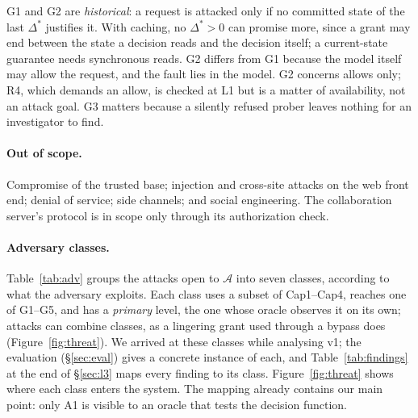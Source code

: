 \documentclass[sigconf,review,anonymous]{acmart}
\begin{document}
G1 and G2 are \emph{historical}: a request is attacked only if no committed state of the last $\Delta^\ast$
justifies it. With caching, no $\Delta^\ast>0$ can promise more, since a grant may end between the state a
decision reads and the decision itself; a current-state guarantee needs synchronous reads. G2 differs from G1
because the model itself may allow the request, and the fault lies in the model. G2 concerns allows only;
R4, which demands an allow, is checked at L1 but is a matter of availability, not an attack goal. G3 matters
because a silently refused prober leaves nothing for an investigator to find.

\paragraph{Out of scope.} Compromise of the trusted base; injection and cross-site attacks on the web
front end; denial of service; side channels; and social engineering. The collaboration server's protocol is in
scope only through its authorization check.

\paragraph{Adversary classes.} Table~\ref{tab:adv} groups the attacks open to $\mathcal{A}$ into seven classes,
according to what the adversary exploits. Each class uses a subset of Cap1--Cap4, reaches one of G1--G5, and has a
\emph{primary} level, the one whose oracle observes it on its own; attacks can combine classes, as a lingering
grant used through a bypass does (Figure~\ref{fig:threat}). We arrived at these classes while analysing v1; the evaluation (\S\ref{sec:eval}) gives a
concrete instance of each, and Table~\ref{tab:findings} at the end of \S\ref{sec:l3} maps every finding to its
class. Figure~\ref{fig:threat} shows where each class enters the system. The mapping already contains our main point:
only A1 is visible to an oracle that tests the decision function.
\end{document}
